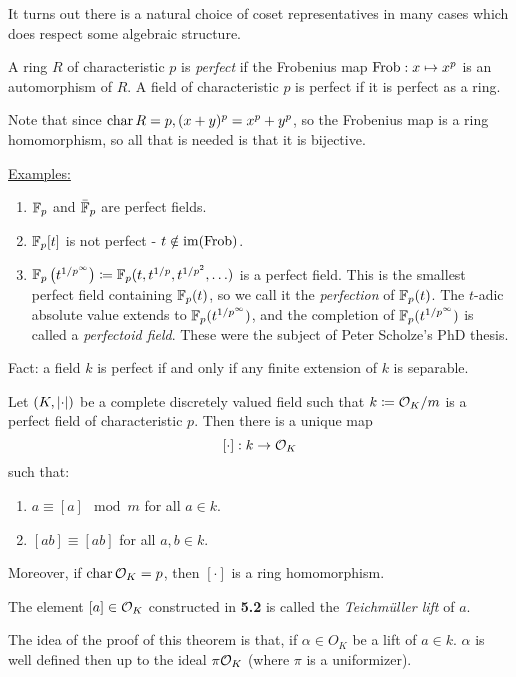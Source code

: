 \documentclass[10pt,a4paper]{article}
\begin{document}
It turns out there is a natural choice of coset representatives in many cases which does respect some algebraic structure.

\begin{definition}
  A ring $R$ of characteristic $p$ is \emph{perfect} if the Frobenius map $\operatorname{Frob}: x \mapsto x^p$ is an automorphism of $R$. A field of characteristic $p$ is perfect if it is perfect as a ring.
\end{definition}
Note that since $\operatorname{char} R = p, (x+y)^p = x^p + y^p$, so the Frobenius map is a ring homomorphism, so all that is needed is that it is bijective.

\underline{Examples:}
\begin{enumerate}
  \item $\mathbb{F}_p$ and $\bar{\mathbb{F}}_p$ are perfect fields.
  \item $\mathbb{F}_p[t]$ is not perfect - $t \notin \operatorname{im}(\operatorname{Frob})$.
  \item $\mathbb{F}_p\left(t^{1/p^\infty}\right) \coloneqq \mathbb{F}_p(t, t^{1/p}, t^{1/p^2}, \ldots)$ is a perfect field. This is the smallest perfect field containing $\mathbb{F}_p(t)$, so we call it the \emph{perfection} of $\mathbb{F}_p(t)$. The $t$-adic absolute value extends to $\mathbb{F}_p(t^{1/p^\infty})$, and the completion of $\mathbb{F}_p(t^{1/p^\infty})$ is called a \emph{perfectoid field}. These were the subject of Peter Scholze's PhD thesis.
\end{enumerate}
Fact: a field $k$ is perfect if and only if any finite extension of $k$ is separable.

\begin{theorem}
  Let $(K, \lvert\cdot\rvert)$ be a complete discretely valued field such that $k \coloneqq \mathcal{O}_K/m$ is a perfect field of characteristic $p$. Then there is a unique map \[ [\cdot]:k \to \mathcal{O}_K\] such that:
  \begin{enumerate}
    \item $a \equiv [a] \mod m$ for all $a \in k$.
    \item $[ab] \equiv [ab]$ for all $a, b \in k$.
  \end{enumerate}
  Moreover, if $\operatorname{char} \mathcal{O}_K = p$, then $[\cdot]$ is a ring homomorphism.
\end{theorem}
\begin{definition}
  The element $[a] \in \mathcal{O}_K$ constructed in \textbf{5.2} is called the \emph{Teichm\"uller lift} of $a$.
\end{definition}
The idea of the proof of this theorem is that, if $\alpha \in O_K$ be a lift of $a \in k$. $\alpha$ is well defined then up to the ideal $\pi\mathcal{O}_K$ (where $\pi$ is a uniformizer).
\end{document}
